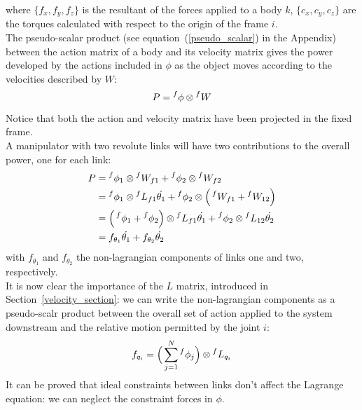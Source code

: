 \documentclass[a4paper,12pt,oneside]{report}
\begin{document}
where $\{f_x,f_y,f_z\}$ is the resultant of the forces applied to a body $k$, $\{c_x,c_y,c_z\}$ are the torques calculated with respect to the origin of the frame $i$.\\
The pseudo-scalar product (see equation~(\ref{pseudo_scalar}) in the Appendix) between the action matrix of a body and its velocity matrix gives the power developed by the actions included in $\phi$ as the object moves according to the velocities described by $W$:
\begin{equation}
  P=\prescript{f}{}{\phi}\otimes \prescript{f}{}{W}
\end{equation}
Notice that both the action and velocity matrix have been projected in the fixed frame.\\
A manipulator with two revolute links will have two contributions to the overall power, one for each link:
\begin{equation}
  \begin{split}
  P&=\prescript{f}{}{\phi_1}\otimes \prescript{f}{}{W_{f1}}+\prescript{f}{}{\phi_2}\otimes \prescript{f}{}{W_{f2}}\\
   &=\prescript{f}{}{\phi_1}\otimes \prescript{f}{}{L_{f1}}\dot{\theta_1}+\prescript{f}{}{\phi_2}\otimes \Big(\prescript{f}{}{W_{f1}}+\prescript{f}{}{W_{12}}\Big)\\
   &=\Big(\prescript{f}{}{\phi_1}+\prescript{f}{}{\phi_2}\Big)\otimes\prescript{f}{}{L_{f1}}\dot{\theta_1}+\prescript{f}{}{\phi_2}\otimes \prescript{f}{}{L_{12}}\dot{\theta_2}\\
   &=f_{\theta_1}\dot{\theta_1}+f_{\theta_2}\dot{\theta_2}
  \end{split}
\end{equation}
with $f_{\theta_1}$ and $f_{\theta_2}$ the non-lagrangian components of links one and two, respectively.\\
It is now clear the importance of the $L$ matrix, introduced in Section~\ref{velocity_section}: we can write the non-lagrangian components as a pseudo-scalr product between the overall set of action applied to the system downstream and the relative motion permitted by the joint $i$:
\begin{equation}
  f_{q_i}=\Big(\sum_{j=1}^N\prescript{f}{}{\phi_j}\Big)\otimes \prescript{f}{}{L_{q_i}}
\label{non_lagrangian_matrix}
\end{equation}
It can be proved that ideal constraints between links don't affect the Lagrange equation: we can neglect the constraint forces in $\phi$.\\
\end{document}

